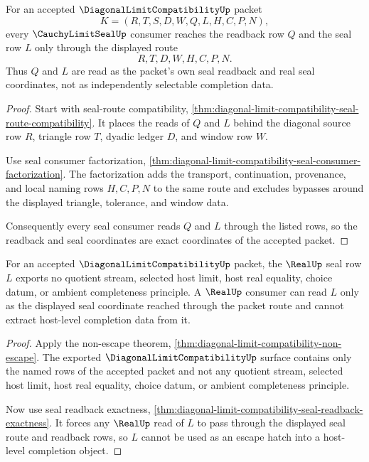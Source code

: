 \begin{theorem}
\label{thm:diagonal-limit-compatibility-seal-readback-exactness}
For an accepted $\DiagonalLimitCompatibilityUp$ packet
$$
K=(R,T,S,D,W,Q,L,H,C,P,N),
$$
every $\CauchyLimitSealUp$ consumer reaches the readback row $Q$ and the
seal row $L$ only through the displayed route
$$
R,T,D,W,H,C,P,N.
$$
Thus $Q$ and $L$ are read as the packet's own seal readback and real seal
coordinates, not as independently selectable completion data.
\end{theorem}
\begin{proof}
Start with seal-route compatibility,
\autoref{thm:diagonal-limit-compatibility-seal-route-compatibility}. It
places the reads of $Q$ and $L$ behind the diagonal source row $R$, triangle
row $T$, dyadic ledger $D$, and window row $W$.

Use seal consumer factorization,
\autoref{thm:diagonal-limit-compatibility-seal-consumer-factorization}. The
factorization adds the transport, continuation, provenance, and local naming
rows $H,C,P,N$ to the same route and excludes bypasses around the displayed
triangle, tolerance, and window data.

Consequently every seal consumer reads $Q$ and $L$ through the listed rows,
so the readback and seal coordinates are exact coordinates of the accepted
packet.
\end{proof}

\begin{theorem}
\label{thm:diagonal-limit-compatibility-real-seal-nonescape}
For an accepted $\DiagonalLimitCompatibilityUp$ packet, the $\RealUp$ seal row
$L$ exports no quotient stream, selected host limit, host real equality,
choice datum, or ambient completeness principle. A $\RealUp$ consumer can read
$L$ only as the displayed seal coordinate reached through the packet route and
cannot extract host-level completion data from it.
\end{theorem}
\begin{proof}
Apply the non-escape theorem,
\autoref{thm:diagonal-limit-compatibility-non-escape}. The exported
$\DiagonalLimitCompatibilityUp$ surface contains only the named rows of the
accepted packet and not any quotient stream, selected host limit, host real
equality, choice datum, or ambient completeness principle.

Now use seal readback exactness,
\autoref{thm:diagonal-limit-compatibility-seal-readback-exactness}. It forces
any $\RealUp$ read of $L$ to pass through the displayed seal route and
readback rows, so $L$ cannot be used as an escape hatch into a host-level
completion object.
\end{proof}

